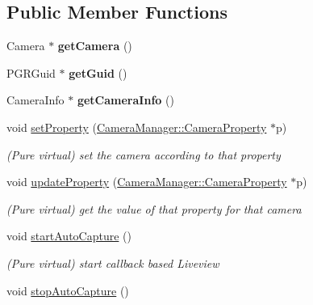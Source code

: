 \subsection*{Public Member Functions}
\begin{DoxyCompactItemize}
\item 
\hypertarget{class_is_camera_ab1f39bed7530f03cf07c3ae6c53d045e}{Camera $\ast$ {\bfseries get\-Camera} ()}\label{class_is_camera_ab1f39bed7530f03cf07c3ae6c53d045e}

\item 
\hypertarget{class_is_camera_a08a1845f52db3f52fae52aa2ce63783b}{P\-G\-R\-Guid $\ast$ {\bfseries get\-Guid} ()}\label{class_is_camera_a08a1845f52db3f52fae52aa2ce63783b}

\item 
\hypertarget{class_is_camera_acfd929b7612162a9897f0be21b2bea4f}{Camera\-Info $\ast$ {\bfseries get\-Camera\-Info} ()}\label{class_is_camera_acfd929b7612162a9897f0be21b2bea4f}

\item 
void \hyperlink{class_is_camera_a70c90a32bde9fcc3c594a526c7cba33c}{set\-Property} (\hyperlink{class_camera_manager_1_1_camera_property}{Camera\-Manager\-::\-Camera\-Property} $\ast$p)
\begin{DoxyCompactList}\small\item\em (Pure virtual) set the camera according to that property \end{DoxyCompactList}\item 
void \hyperlink{class_is_camera_a5e2c484168c627eb79d61658e880300d}{update\-Property} (\hyperlink{class_camera_manager_1_1_camera_property}{Camera\-Manager\-::\-Camera\-Property} $\ast$p)
\begin{DoxyCompactList}\small\item\em (Pure virtual) get the value of that property for that camera \end{DoxyCompactList}\item 
\hypertarget{class_is_camera_ad272b7a566ab9d226c96b331a0e8b5ab}{void \hyperlink{class_is_camera_ad272b7a566ab9d226c96b331a0e8b5ab}{start\-Auto\-Capture} ()}\label{class_is_camera_ad272b7a566ab9d226c96b331a0e8b5ab}

\begin{DoxyCompactList}\small\item\em (Pure virtual) start callback based Liveview \end{DoxyCompactList}\item 
\hypertarget{class_is_camera_a71a1959c599bb6f296dc59965a41b8c7}{void \hyperlink{class_is_camera_a71a1959c599bb6f296dc59965a41b8c7}{stop\-Auto\-Capture} ()}\label{class_is_camera_a71a1959c599bb6f296dc59965a41b8c7}


\end{DoxyCompactItemize}
